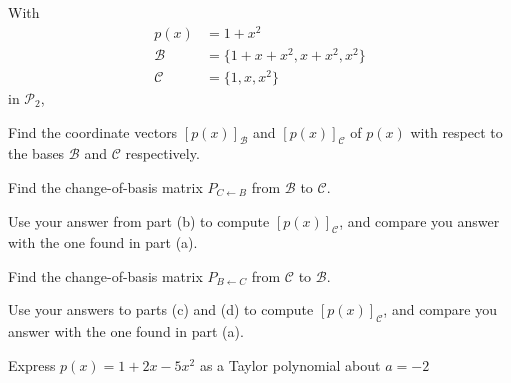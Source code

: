 \documentclass[oneperpage]{gsypset}
\begin{document}
	\begin{problem}[6.3.7]
		With
		\begin{align*}
			p(x) &= 1 + x^2 \\
			\mathcal{B} &= \{1+x+x^2, x+x^2, x^2\} \\
			\mathcal{C} &= \{1,x,x^2\}
		\end{align*}
		in $\mathscr{P}_2$,
		\begin{subproblems}[(a)]
			\subproblem
				Find the coordinate vectors $[p(x)]_\mathcal{B}$ and $[p(x)]_\mathcal{C}$
				of $p(x)$ with respect to the bases $\mathcal{B}$ and $\mathcal{C}$ respectively.
				\begin{solution}
					
				\end{solution}
				
			\subproblem
				Find the change-of-basis matrix $P_{C \leftarrow B}$ from $\mathcal{B}$ to $\mathcal{C}$.
				\begin{solution}
					
				\end{solution}
				
			\subproblem
				Use your answer from part (b) to compute $[p(x)]_\mathcal{C}$, 
				and compare you answer with the one found in part (a).
				\begin{solution}
					
				\end{solution}
				
			\subproblem
				Find the change-of-basis matrix $P_{B \leftarrow C}$ from $\mathcal{C}$ to $\mathcal{B}$.
				\begin{solution}
					
				\end{solution}
				
			\subproblem
				Use your answers to parts (c) and (d) to compute $[p(x)]_\mathcal{C}$, 
				and compare you answer with the one found in part (a).
				\begin{solution}
					
				\end{solution}
		\end{subproblems}
	\end{problem}
	
	\begin{problem}[6.3.18]
		Express $p(x)=1 + 2x - 5x^2$ as a Taylor polynomial about $a = -2$
	\end{problem}
	\begin{solution}
		
	\end{solution}
	
\end{document}
